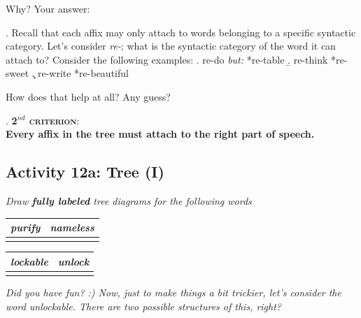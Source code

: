 \documentclass[11pt, oneside]{article}   	%
\begin{document}
\indent Why? Your answer: 

\vspace{2cm}

\ex. Recall that each affix may only attach to words belonging to a specific syntactic category. Let's consider {\itshape re-}; what is the syntactic category of the word it can attach to? Consider the following examples: 
	\a. re-do		{\itshape but:}	*re-table
	\b. re-think		*re-sweet
	\c. re-write		*re-beautiful

How does that help at all? Any guess? \\

\begin{tcolorbox}
\ex. {\bfseries \scshape 2$^{nd}$ criterion}:\\
{\bfseries Every affix in the tree must attach to the right part of speech.}

\end{tcolorbox}

\newpage

\subsection{Activity 12a: Tree (I)}

{\itshape Draw {\bfseries fully labeled} tree diagrams for the following words}

\begin{center}
\begin{tabular}{| P{0.4\textwidth} | P{0.4\textwidth} |}\hline
\textit{purify}	&	\textit{nameless} \\ \hline
		&	\\[5cm] \hline
\end{tabular}
\end{center}

\begin{center}
\begin{tabular}{| P{0.4\textwidth} | P{0.4\textwidth} |}\hline
\textit{lockable}	&	\textit{unlock} \\ \hline
		&	\\[5cm] \hline
\end{tabular}
\end{center}

\newpage

{\itshape Did you have fun? :) Now, just to make things a bit trickier, let's consider the word {\itshape unlockable}. There are two possible structures of this, right?}
\end{document}
